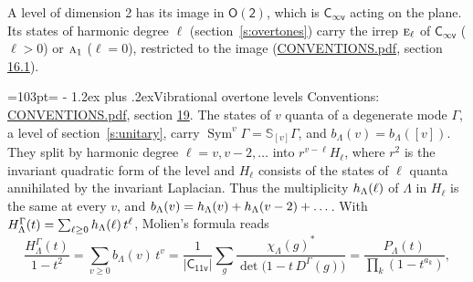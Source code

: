 \documentclass[10pt,a4paper]{article}
\makeatletter
\renewcommand\section{\@startsection{section}{1}{\z@}{-3ex plus -1ex minus -.2ex}%
  {1.2ex plus .2ex}{\normalfont\large\sffamily\bfseries\color{parttitle}}}
\newcommand{\needspace}[1]{\par\penalty-100\begingroup\dimen0=#1\relax\dimen2=\pagegoal
  \advance\dimen2-\pagetotal\ifdim\dimen0>\dimen2\relax\ifdim\dimen2>0pt\vfil\break\fi\fi
  \endgroup}
\numberwithin{equation}{section}
\newcommand{\grp}[1]{\mathsf{#1}}
\newcommand{\irr}[1]{\text{\normalfont\scshape #1}}
\newcommand{\repD}[1]{D^{#1}}
\newcommand{\irchar}[1]{\chi_{#1}}
\newcommand{\conj}[1]{{#1}^{*}}
\newcommand{\schur}[1]{\mathbb{S}_{#1}}
\newcommand{\shape}[1]{[#1]}
\makeatother
\begin{document}
A level of dimension 2 has its image in $\grp{O(2)}$, which is \href{Cinfv.pdf}{$\grp{C_{\infty v}}$} acting on the plane. \label{n:index.harmonic.degree}Its states of harmonic degree $\ell$ (section~\ref{s:overtones}) carry the irrep $\irr{e}_{\ell}$ of \href{Cinfv.pdf}{$\grp{C_{\infty v}}$} ($\ell > 0$) or $\irr{a}_{1}$ ($\ell = 0$), restricted to the image (\href{../../CONVENTIONS.pdf}{CONVENTIONS.pdf}, section \href{../../CONVENTIONS.pdf\#conv.16.1}{16.1}).
\needspace{103pt}
\section{Vibrational overtone levels}\label{s:overtones}
Conventions: \href{../../CONVENTIONS.pdf}{CONVENTIONS.pdf}, section \href{../../CONVENTIONS.pdf\#conv.19}{19}.
\leavevmode\label{n:index.quanta}\label{n:operator.symmetric.power}The states of $v$ quanta of a degenerate mode $\Gamma$, a level of section~\ref{s:unitary}, carry $\operatorname{Sym}^{v}\Gamma = \schur{\shape{v}}\Gamma$, and $b_\Lambda(v) = b_\Lambda(\shape{v})$. \label{n:local.quadratic.form}\label{n:set.harmonic}They split by harmonic degree $\ell = v, v - 2, \dots$ into $r^{v-\ell}H_\ell$, where $r^2$ is the invariant quadratic form of the level and $H_\ell$ consists of the states of $\ell$ quanta annihilated by the invariant Laplacian. \label{n:function.multiplicity.harmonic}Thus the multiplicity $\mathnormal{h}_\Lambda(\ell)$ of $\Lambda$ in $H_\ell$ is the same at every $v$, and $b_\Lambda(v) = \mathnormal{h}_\Lambda(v) + \mathnormal{h}_\Lambda(v - 2) + \dots$. \label{n:function.generating.level}With $H^{\Gamma}_\Lambda(t) = \sum_{\ell\ge0} \mathnormal{h}_\Lambda(\ell)\,t^{\ell}$, Molien's formula reads
\begin{equation}\label{e:molien}\frac{H^{\Gamma}_\Lambda(t)}{1 - t^2} = \sum_{v\ge0} b_\Lambda(v)\,t^v = \frac{1}{|\grp{C_{11v}}|}\sum_{g}\frac{\conj{\irchar{\Lambda}(g)}}{\det\bigl(1 - t\,\repD{\Gamma}(g)\bigr)} = \frac{P_\Lambda(t)}{\prod_k (1-t^{a_k})},\end{equation}
\end{document}
